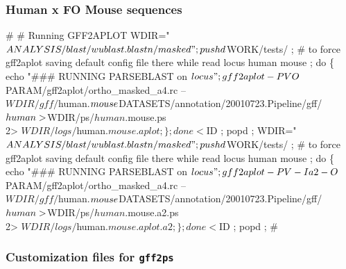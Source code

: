 \documentclass[11pt]{article}
\def\nwendcode{\endtrivlist \endgroup} %
\let\nwdocspar=\par                    %
\newcommand{\subsubsctn}[1]{\subsubsection{#1}}
\def\gps{\texttt{gff2ps}}
\begin{document}
\subsubsctn{Human x FO Mouse sequences}

\nwenddocs{}\plusendmoddef
#
# Running GFF2APLOT
WDIR="$ANALYSIS/blast/wublast.blastn/masked" ;
pushd $WORK/tests/ ; # to force gff2aplot saving default config file there
while read locus human mouse ;
  do \{
    echo "### RUNNING PARSEBLAST on $locus" ;
    gff2aplot -PVO $PARAM/gff2aplot/ortho_masked_a4.rc -- \\
                   $WDIR/gff/$human.$mouse \\
                   $DATASETS/annotation/20010723.Pipeline/gff/$human \\
                 > $WDIR/ps/$human.$mouse.ps \\
                2> $WDIR/logs/$human.$mouse.aplot ;
    \} ;
  done < $ID ;
popd ;
WDIR="$ANALYSIS/blast/wublast.blastn/masked" ;
pushd $WORK/tests/ ; # to force gff2aplot saving default config file there
while read locus human mouse ;
  do \{
    echo "### RUNNING PARSEBLAST on $locus" ;
    gff2aplot -PV -I a2 -O $PARAM/gff2aplot/ortho_masked_a4.rc -- \\
                   $WDIR/gff/$human.$mouse \\
                   $DATASETS/annotation/20010723.Pipeline/gff/$human \\
                 > $WDIR/ps/$human.$mouse.a2.ps \\
                2> $WDIR/logs/$human.$mouse.aplot.a2 ;
    \} ;
  done < $ID ;
popd ;
#
\nwendcode{}\nwdocspar

\subsubsctn{Customization files for {\gps}}
\end{document}
